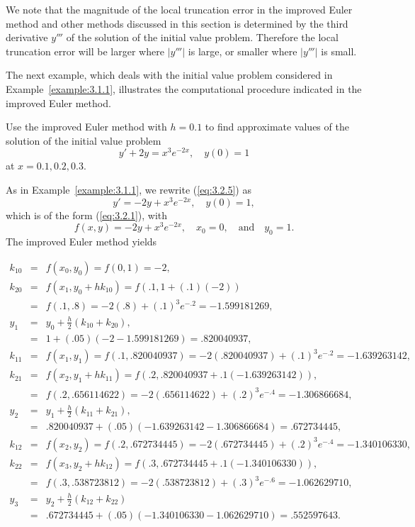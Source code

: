 \documentclass{ximera}
\begin{document}
We note that the magnitude of the local truncation error in the
improved Euler method and other methods discussed in this section is
determined by the third derivative $y'''$ of the solution of the
initial value problem. Therefore the local truncation error will be
larger where $|y'''|$ is large, or smaller where $|y'''|$ is small.

The next example, which deals with the initial value problem
considered in Example~\ref{example:3.1.1}, illustrates
the computational procedure indicated in the improved Euler method.

\begin{example}\label{example:3.2.1}
Use the improved Euler method with $h=0.1$ to find approximate values
of the solution of the initial value problem
\begin{equation}\label{eq:3.2.5}
y'+2y=x^3e^{-2x},\quad y(0)=1
\end{equation}
at $x=0.1,0.2,0.3$.

\begin{explanation}
As in Example~\ref{example:3.1.1}, we rewrite (\ref{eq:3.2.5})  as
$$
y'=-2y+x^3e^{-2x},\quad y(0)=1,
$$
which is of the form (\ref{eq:3.2.1}), with
$$
f(x,y)=-2y+x^3e^{-2x},\quad x_0=0,\quad\mbox{and}\quad y_0=1.
$$
The improved Euler method yields

\begin{eqnarray*}
k_{10} & = & f(x_0,y_0)
  = f(0,1)=-2,\\
k_{20} & = & f(x_1,y_0+hk_{10})=f(.1,1+(.1)(-2))\\
 &=& f(.1,.8)=-2(.8)+(.1)^3e^{-.2}=-1.599181269,\\
y_1&=&y_0+\frac{h}{2}(k_{10}+k_{20}),\\
&=&1+(.05)(-2-1.599181269)=.820040937,\\
k_{11} & = & f(x_1,y_1)
  = f(.1,.820040937)= -2(.820040937)+(.1)^3e^{-.2}=-1.639263142,\\
k_{21} & = & f(x_2,y_1+hk_{11})=f(.2,.820040937+.1(-1.639263142)),\\
 &=&
f(.2,.656114622)=-2(.656114622)+(.2)^3e^{-.4}=-1.306866684,\\
y_2&=&y_1+\frac{h}{2}(k_{11}+k_{21}),\\
&=&.820040937+(.05)(-1.639263142-1.306866684)=.672734445,\\
k_{12} & = & f(x_2,y_2)
  = f(.2,.672734445)= -2(.672734445)+(.2)^3e^{-.4}=-1.340106330,\\
k_{22} & = & f(x_3,y_2+hk_{12})=f(.3,.672734445+.1(-1.340106330)),\\
 &=&
f(.3,.538723812)=-2(.538723812)+(.3)^3e^{-.6}=-1.062629710,\\
y_3&=&y_2+\frac{h}{2}(k_{12}+k_{22})\\
&=&.672734445+(.05)(-1.340106330-1.062629710)=.552597643.
\end{eqnarray*}
\end{explanation}
\end{example}
\end{document}
